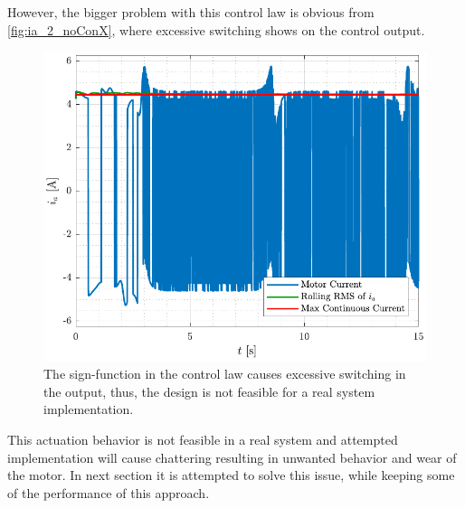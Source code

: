 %
However, the bigger problem with this control law is obvious from \autoref{fig:ia_2_noConX}, where excessive switching shows on the control output.
%
\begin{figure}[H]
  \includegraphics[width=.52\textwidth]{figures/ia_2_noConX}
  \caption{The sign-function in the control law causes excessive switching in the output, thus, the design is not feasible for a real system implementation.}
  \label{fig:ia_2_noConX}
\end{figure}
%
This actuation behavior is not feasible in a real system and attempted implementation will cause chattering resulting in unwanted behavior and wear of the motor. In next section it is attempted to solve this issue, while keeping some of the performance of this approach.
%
%
%
%

